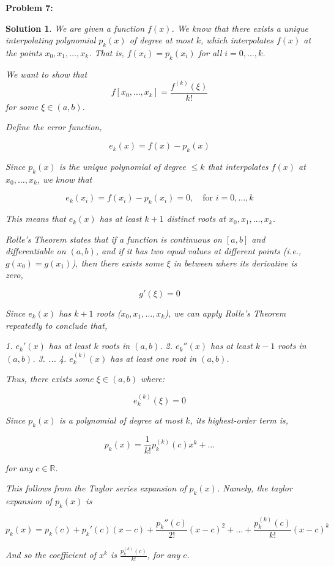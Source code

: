 \documentclass[12pt, letterpaper]{article}
\theoremstyle{nonumberplain}
\newtheorem{sol}{Solution}
\begin{document}
\hspace{18pt}\textbf{Problem 7:} \medskip
\begin{sol}
	We are given a function $f(x)$. We know that there exists a unique interpolating polynomial $p_{k}(x)$ of degree at most $k$, which interpolates $f(x)$ at the points $x_0, x_1, \dots, x_k$. That is, $f(x_i) = p_k(x_i)$ for all $i = 0, \ldots, k$.

	We want to show that
	$$f[x_0, \dots, x_k] = \frac{f^{(k)}(\xi)}{k!}$$
	for some $\xi \in (a, b)$.

	Define the error function,

	$$e_k(x) = f(x) - p_k(x)$$

	Since $p_k(x)$ is the unique polynomial of degree $\leq k$ that interpolates $f(x)$ at $x_0, \dots, x_k$, we know that

	$$e_k(x_i) = f(x_i) - p_k(x_i) = 0, \quad \text{for } i = 0, \dots, k$$

	This means that $e_k(x)$ has at least $k+1$ distinct roots at $x_0, x_1, \ldots, x_k$.

	Rolle’s Theorem states that if a function is continuous on $[a, b]$ and differentiable on $(a, b)$, and if it has two equal values at different points (i.e., $g(x_0) = g(x_1)$), then there exists some $\xi$ in between where its derivative is zero,

	$$g'(\xi) = 0$$

	Since $e_k(x)$ has $k+1$ roots ($x_0, x_1, \dots, x_k$), we can apply Rolle’s Theorem repeatedly to conclude that,

	1. $e_k'(x)$ has at least $k$ roots in $(a, b)$.
	2. $e_k''(x)$ has at least $k-1$ roots in $(a, b)$.
	3. ...
	4. $e_k^{(k)}(x)$ has at least one root in $(a, b)$.

	Thus, there exists some $\xi \in (a, b)$ where:

	$$e_k^{(k)}(\xi) = 0$$

	Since $p_k(x)$ is a polynomial of degree at most $k$, its highest-order term is,

	$$p_k(x) = \frac{1}{k!} p_k^{(k)}(c) x^k + \ldots$$

	for any $c \in \mathbb{R}$.

	This follows from the Taylor series expansion of $p_k(x)$. Namely, the taylor expansion of $p_k(x)$ is

	$$ p_k(x) = p_k(c) + p_k'(c)(x-c) + \frac{p_k''(c)}{2!}(x-c)^2 + \ldots + \frac{p_k^{(k)}(c)}{k!}(x-c)^k  $$

	And so the coefficient of $x^k$ is $\frac{p_k^{(k)}(c)}{k!}$, for any $c$.


\end{sol}
\end{document}
